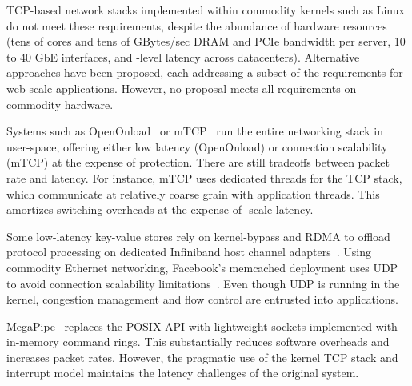 TCP-based network stacks implemented within commodity kernels such as
Linux do not meet these requirements, despite the abundance of hardware
resources (tens of cores and tens of GBytes/sec DRAM and PCIe
bandwidth per server, 10 to 40 GbE interfaces, and \microsecond-level
latency across datacenters).
Alternative approaches have been proposed, each addressing a subset of
the requirements for web-scale applications. However, no
proposal meets all requirements on commodity hardware. 

 Systems such as
OpenOnload~\cite{openonload} or mTCP~\cite{jeong2014mtcp} run the
entire networking stack in user-space, offering either low latency
(OpenOnload) or connection scalability (mTCP) at the expense of
protection. There are still tradeoffs between packet rate and
latency. For instance, mTCP uses dedicated threads for the TCP
stack, which communicate at relatively coarse grain with application
threads. This amortizes switching overheads at the
expense of \microsecond-scale latency.

 Some low-latency key-value stores rely on
kernel-bypass and RDMA to offload protocol processing on dedicated
Infiniband host channel
adapters~\cite{DBLP:conf/sosp/OngaroRSOR11,Jose:2011:MDH}.  Using
commodity Ethernet networking, Facebook's memcached deployment uses
UDP to avoid connection scalability
limitations~\cite{nishtala2013scaling}. Even though UDP is running in
the kernel, congestion management and flow control are entrusted into
applications.

 MegaPipe~\cite{han2012megapipe}
replaces the POSIX API with lightweight sockets implemented with
in-memory command rings. This substantially reduces software overheads
and increases packet rates. However, the pragmatic use of the kernel
TCP stack and interrupt model maintains the latency challenges of the
original system.

